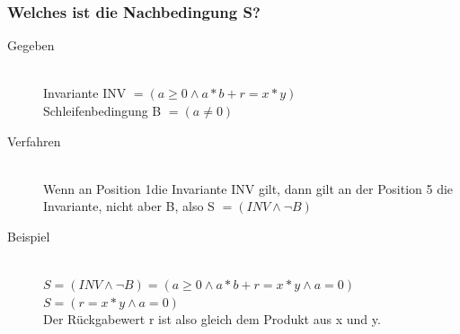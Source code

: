 \documentclass[a4paper,10pt]{article}
\begin{document}
\subsubsection{Welches ist die Nachbedingung S?}
\begin{description}
	\item[Gegeben] \hfill \\
		Invariante INV $= (a \geq 0 \wedge a*b + r = x*y)$ \\
		Schleifenbedingung B $= (a \neq 0)$
	\item[Verfahren] \hfill \\
		Wenn an Position 1die Invariante INV gilt, dann gilt an der Position 5 die Invariante, nicht aber B, also S $= (INV \wedge \neg B)$
	\item[Beispiel] \hfill \\
		$S = (INV \wedge \neg B) = (a \geq 0 \wedge a*b + r = x*y \wedge a = 0)$ \\
		$S = (r = x*y \wedge a = 0)$ \\
		Der R\"uckgabewert r ist also gleich dem Produkt aus x und y.
\end{description}
\end{document}
